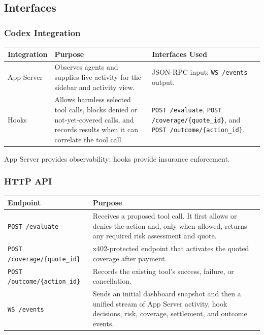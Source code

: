 \documentclass[11pt]{article}
\begin{document}
\subsection{Interfaces}

\subsubsection{Codex Integration}

\begin{tabularx}{\textwidth}{@{}lXX@{}}
\toprule
\textbf{Integration} & \textbf{Purpose} & \textbf{Interfaces Used} \\
\midrule
App Server &
Observes agents and supplies live activity for the sidebar and activity view. &
JSON-RPC input; \texttt{WS /events} output. \\
Hooks &
Allows harmless selected tool calls, blocks denied or not-yet-covered calls, and
records results when it can correlate the tool call. &
\texttt{POST /evaluate}, \texttt{POST /coverage/\{quote\_id\}}, and
\texttt{POST /outcome/\{action\_id\}}. \\
\bottomrule
\end{tabularx}

App Server provides observability; hooks provide insurance enforcement.

\subsubsection{HTTP API}

\begin{tabularx}{\textwidth}{@{}lX@{}}
\toprule
\textbf{Endpoint} & \textbf{Purpose} \\
\midrule
\texttt{POST /evaluate} &
Receives a proposed tool call. It first allows or denies the action and, only
when allowed, returns any required risk assessment and quote. \\
\texttt{POST /coverage/\{quote\_id\}} &
x402-protected endpoint that activates the quoted coverage after payment. \\
\texttt{POST /outcome/\{action\_id\}} &
Records the existing tool's success, failure, or cancellation. \\
\texttt{WS /events} &
Sends an initial dashboard snapshot and then a unified stream of App Server
activity, hook decisions, risk, coverage, settlement, and outcome events. \\
\bottomrule
\end{tabularx}
\end{document}
